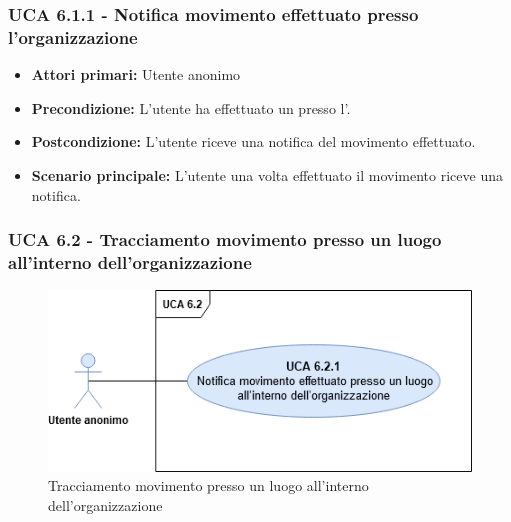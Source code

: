 \subsubsection{UCA 6.1.1 - Notifica movimento effettuato presso l'organizzazione}
\begin{itemize}
	\item \textbf{Attori primari:} Utente anonimo
	\item \textbf{Precondizione:} L'utente ha effettuato un  presso l'.
	\item \textbf{Postcondizione:} L'utente riceve una notifica del movimento effettuato.
	\item \textbf{Scenario principale:} L'utente una volta effettuato il movimento riceve una notifica.	
\end{itemize}

\subsubsection{UCA 6.2 - Tracciamento movimento presso un luogo all'interno dell'organizzazione}

\begin{figure}[h]
	\centering
	\includegraphics[scale=0.4, center]{Sezioni/UseCase/Immagini/UCA6.2.png}
	\caption{Tracciamento movimento presso un luogo all'interno dell'organizzazione}
\end{figure}


